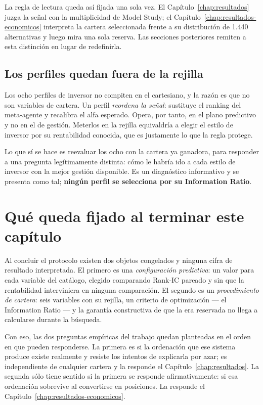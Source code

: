 La regla de lectura queda así fijada una sola vez. El Capítulo~\ref{chap:resultados} juzga la señal
con la multiplicidad de Model Study; el Capítulo~\ref{chap:resultados-economicos} interpreta la
cartera seleccionada frente a su distribución de 1.440 alternativas y luego mira una sola reserva.
Las secciones posteriores remiten a esta distinción en lugar de redefinirla.

\subsection*{Los perfiles quedan fuera de la rejilla}

Los ocho perfiles de inversor no compiten en el cartesiano, y la razón es que no son variables de
cartera. Un perfil \emph{reordena la señal}: sustituye el ranking del meta-agente y recalibra el
alfa esperado. Opera, por tanto, en el plano predictivo y no en el de gestión. Meterlos en la
rejilla equivaldría a elegir el estilo de inversor por su rentabilidad conocida, que es justamente
lo que la regla protege.

Lo que sí se hace es reevaluar los ocho con la cartera ya ganadora, para responder a una pregunta
legítimamente distinta: cómo le habría ido a cada estilo de inversor con la mejor gestión
disponible. Es un diagnóstico informativo y se presenta como tal; \textbf{ningún perfil se
selecciona por su Information Ratio}.

\section*{Qué queda fijado al terminar este capítulo}

Al concluir el protocolo existen dos objetos congelados y ninguna cifra de resultado interpretada.
El primero es una \emph{configuración predictiva}: un valor para cada variable del catálogo,
elegido comparando Rank-IC pareado y sin que la rentabilidad interviniera en ninguna comparación.
El segundo es un \emph{procedimiento de cartera}: seis variables con su rejilla, un criterio de
optimización --- el Information Ratio --- y la garantía constructiva de que la era reservada no
llega a calcularse durante la búsqueda.

Con eso, las dos preguntas empíricas del trabajo quedan planteadas en el orden en que pueden
responderse. La primera es si la ordenación que ese sistema produce existe realmente y resiste los
intentos de explicarla por azar; es independiente de cualquier cartera y la responde el
Capítulo~\ref{chap:resultados}. La segunda sólo tiene sentido si la primera se responde
afirmativamente: si esa ordenación sobrevive al convertirse en posiciones. La responde el
Capítulo~\ref{chap:resultados-economicos}.

